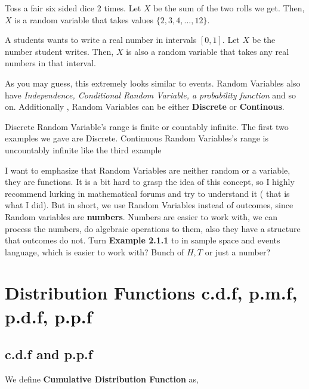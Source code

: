 \begin{example}
    Toss a fair six sided dice 2 times. Let $X$ be the sum of the two rolls we get. Then, $X$ is a random variable that takes values $\{2,3,4,...,12\}$.
\end{example}

\begin{example}
    A students wants to write a real number in intervals $[0,1]$. Let $X$ be the number student writes. Then, $X$ is also a random variable that takes any real numbers in that interval.
\end{example}

As you may guess, this extremely looks similar to events. Random Variables also have \textit{Independence, Conditional Random Variable, a probability function} and so on. Additionally , Random Variables can be either \textbf{Discrete} or \textbf{Continous}.
\par 
Discrete Random Variable's range is finite or countably infinite. The first two examples we gave are Discrete. Continuous Random Variables's range is uncountably infinite like the third example \newline

I want to emphasize  that Random Variables are neither random or a variable, they are functions. It is a bit hard to grasp the idea of this concept, so I highly recommend lurking in mathematical forums and try to understand it ( that is what I did). But in short, we use Random Variables instead of outcomes, since Random variables are \textbf{numbers}. Numbers are easier to work with, we can process the numbers, do algebraic operations to them, also they have a structure that outcomes do not.
Turn \textbf{ Example 2.1.1} to in sample space and events language, which is easier to work with? Bunch of $H,T$ or just a number?





\section{Distribution Functions c.d.f, p.m.f, p.d.f, p.p.f}
\subsection*{c.d.f and p.p.f}
We define  \textbf{Cumulative Distribution Function} as,

